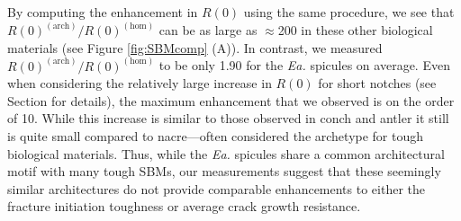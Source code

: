\documentclass[12pt,onecolumn]{article}
\makeatletter
\DeclareRobustCommand*{\nameref}[1]{%
      \emph{\myorg@nameref{#1}}%
    }%
\newcommand{\EA}{\textit{Ea.\@}\xspace}
\makeatother
\begin{document}
\begin{bibunit}
By computing the enhancement in $R(0)$ using the same procedure, we see that $R(0)^{(\mathrm{arch})}/R(0)^{(\mathrm{hom})}$ can be as large as $\approx$200 in these other biological materials (see Figure \ref{fig:SBMcomp} (A)). In contrast, we measured $R(0)^{(\mathrm{arch})}/R(0)^{(\mathrm{hom})}$ to be only 1.90 for the \EA spicules on average. Even when considering the relatively large increase in $R(0)$ for short notches (see Section \nameref{sec:Gc} for details), the maximum enhancement that we observed is on the order of 10. While this increase is similar to those observed in conch and antler it still is quite small compared to nacre---often considered the archetype for tough biological materials. Thus, while the \EA spicules share a common architectural motif with many tough SBMs, our measurements suggest that these seemingly similar architectures do not provide comparable enhancements to either the fracture initiation toughness or average crack growth resistance.


\end{bibunit}
\end{document}
